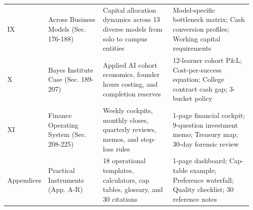 \begin{table}[t]
\begin{tabularx}{\textwidth}{p{1.8cm} p{2.8cm} p{4.4cm} X}
IX & Across Business Models (Sec. 176-188) & Capital allocation dynamics across 13 diverse models from solo to campus entities & Model-specific bottleneck matrix; Cash conversion profiles; Working capital requirements \\
X & Bayes Institute Case (Sec. 189-207) & Applied AI cohort economics, founder hours costing, and completion reserves & 12-learner cohort P\&L; Cost-per-success equation; College contract cash gap; 3-bucket policy \\
XI & Finance Operating System (Sec. 208-225) & Weekly cockpits, monthly closes, quarterly reviews, memos, and stop-loss rules & 1-page financial cockpit; 9-question investment memo; Treasury map; 30-day forensic review \\
Appendices & Practical Instruments (App. A-R) & 18 operational templates, calculators, cap tables, glossary, and 30 citations & 1-page dashboard; Cap-table example; Preference waterfall; Quality checklist; 30 reference notes \\
\bottomrule
\end{tabularx}
\end{table}













